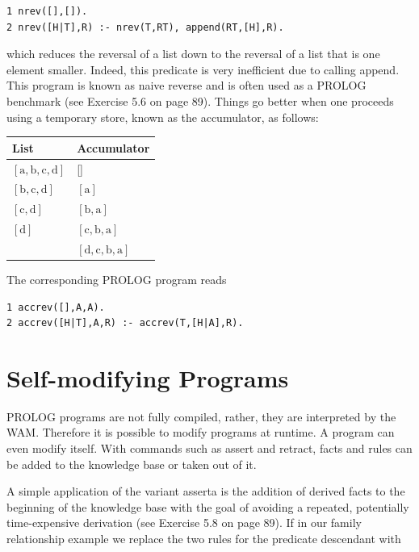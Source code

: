 \documentclass[10pt]{book}
\begin{document}
\begin{verbatim}
1 nrev([],[]).
2 nrev([H|T],R) :- nrev(T,RT), append(RT,[H],R).
\end{verbatim}

which reduces the reversal of a list down to the reversal of a list that is one element smaller. Indeed, this predicate is very inefficient due to calling append. This program is known as naive reverse and is often used as a PROLOG benchmark (see Exercise 5.6 on page 89). Things go better when one proceeds using a temporary store, known as the accumulator, as follows:

\begin{center}
\begin{tabular}{ll}
\hline
List & Accumulator \\
\hline
$[\mathrm{a}, \mathrm{b}, \mathrm{c}, \mathrm{d}]$ & [] \\
\hline
$[\mathrm{b}, \mathrm{c}, \mathrm{d}]$ & $[\mathrm{a}]$ \\
\hline
$[\mathrm{c}, \mathrm{d}]$ & $[\mathrm{b}, \mathrm{a}]$ \\
\hline
$[\mathrm{d}]$ & $[\mathrm{c}, \mathrm{b}, \mathrm{a}]$ \\
\hline
[] & $[\mathrm{d}, \mathrm{c}, \mathrm{b}, \mathrm{a}]$ \\
\hline
\end{tabular}
\end{center}

The corresponding PROLOG program reads

\begin{verbatim}
1 accrev([],A,A).
2 accrev([H|T],A,R) :- accrev(T,[H|A],R).
\end{verbatim}

\section{Self-modifying Programs}
PROLOG programs are not fully compiled, rather, they are interpreted by the WAM. Therefore it is possible to modify programs at runtime. A program can even modify itself. With commands such as assert and retract, facts and rules can be added to the knowledge base or taken out of it.

A simple application of the variant asserta is the addition of derived facts to the beginning of the knowledge base with the goal of avoiding a repeated, potentially time-expensive derivation (see Exercise 5.8 on page 89). If in our family relationship example we replace the two rules for the predicate descendant with
\end{document}
